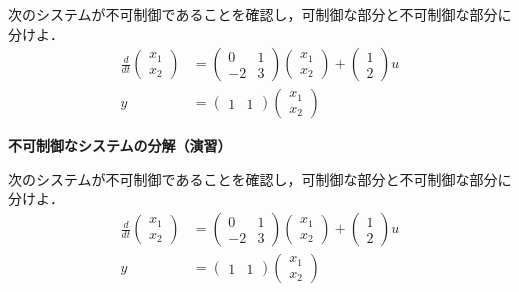 \documentclass[a4paper,11pt,fleqn]{jreport}
\begin{document}
次のシステムが不可制御であることを確認し，可制御な部分と不可制御な部分に分けよ．\begin{align*}
	\frac{d}{dt}
	\left (
	\begin{array}{c}
	 x_1 \\ x_2 
	\end{array}
	\right )
	& = 
	\left (
	\begin{array}{cc}
	 0 & 1 \\
	 -2 & 3
	\end{array}
	\right )
	\left (
	\begin{array}{c}
	 x_1 \\ x_2 
	\end{array}
	\right )
	+
	\left (
	\begin{array}{c}
	 1 \\ 2 
	\end{array}
	\right )
	u
\\
	y 
	&=
	\left (
	\begin{array}{cc}
	 1 & 1  
	\end{array}
	\right )
	\left (
	\begin{array}{c}
	 x_1 \\ x_2 
	\end{array}
	\right )
\end{align*}

\newpage

\noindent
{\bf 不可制御なシステムの分解（演習）}

次のシステムが不可制御であることを確認し，可制御な部分と不可制御な部分に分けよ．\begin{align*}
	\frac{d}{dt}
	\left (
	\begin{array}{c}
	 x_1 \\ x_2 
	\end{array}
	\right )
	& = 
	\left (
	\begin{array}{cc}
	 0 & 1 \\
	 -2 & 3
	\end{array}
	\right )
	\left (
	\begin{array}{c}
	 x_1 \\ x_2 
	\end{array}
	\right )
	+
	\left (
	\begin{array}{c}
	 1 \\ 2 
	\end{array}
	\right )
	u
\\
	y 
	&=
	\left (
	\begin{array}{cc}
	 1 & 1  
	\end{array}
	\right )
	\left (
	\begin{array}{c}
	 x_1 \\ x_2 
	\end{array}
	\right )
\end{align*}
\end{document}
